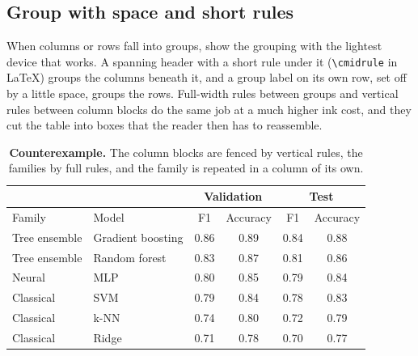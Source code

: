 \FloatBarrier
\subsection{Group with space and short rules}\label{sec-app-table-group}

When columns or rows fall into groups, show the grouping with the lightest device that works. A spanning header with a short rule under it (\verb|\cmidrule| in LaTeX) groups the columns beneath it, and a group label on its own row, set off by a little space, groups the rows. Full-width rules between groups and vertical rules between column blocks do the same job at a much higher ink cost, and they cut the table into boxes that the reader then has to reassemble.

\begin{table}[ht]
	\centering
	\caption{Validation and test scores for three families of models. The grouping is identical in the two versions; only the device that shows it differs.}
	\label{tab-table-group}
	\begin{subtable}[t]{\textwidth}
		\centering
		\caption{\textbf{Counterexample.} The column blocks are fenced by vertical rules, the families by full rules, and the family is repeated in a column of its own.}
		\small
		\begin{tabular}{|l|l||c|c||c|c|}
			\hline
			& & \multicolumn{2}{c||}{Validation} & \multicolumn{2}{c|}{Test} \\
			\hline
			Family & Model & F1 & Accuracy & F1 & Accuracy \\
			\hline
			Tree ensemble & Gradient boosting & 0.86 & 0.89 & 0.84 & 0.88 \\
			Tree ensemble & Random forest & 0.83 & 0.87 & 0.81 & 0.86 \\
			\hline
			Neural & MLP & 0.80 & 0.85 & 0.79 & 0.84 \\
			\hline
			Classical & SVM & 0.79 & 0.84 & 0.78 & 0.83 \\
			Classical & k-NN & 0.74 & 0.80 & 0.72 & 0.79 \\
			Classical & Ridge & 0.71 & 0.78 & 0.70 & 0.77 \\
			\hline
		\end{tabular}
	\end{subtable}


\end{table}
